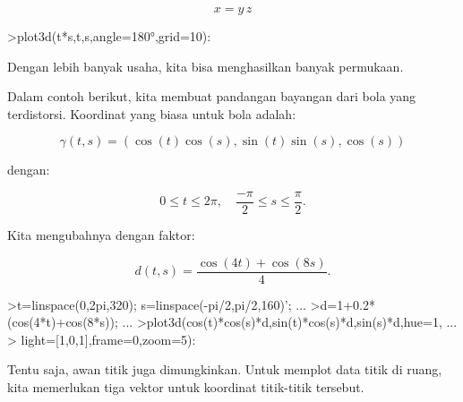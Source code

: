 \documentclass[a4paper,10pt]{article}
\begin{document}
\begin{eulernotebook}
\begin{eulercomment}
\begin{eulercomment}
\begin{eulercomment}
\end{eulercomment}
\begin{eulerformula}
\[
x = y \, z
\]
\end{eulerformula}
\begin{eulerprompt}
>plot3d(t*s,t,s,angle=180°,grid=10):
\end{eulerprompt}
\begin{eulercomment}
Dengan lebih banyak usaha, kita bisa menghasilkan banyak permukaan.

Dalam contoh berikut, kita membuat pandangan bayangan dari bola yang
terdistorsi. Koordinat yang biasa untuk bola adalah:

\end{eulercomment}
\begin{eulerformula}
\[
\gamma(t,s) = (\cos(t)\cos(s),\sin(t)\sin(s),\cos(s))
\]
\end{eulerformula}
\begin{eulercomment}
dengan:

\end{eulercomment}
\begin{eulerformula}
\[
0 \le t \le 2\pi, \quad \frac{-\pi}{2} \le s \le \frac{\pi}{2}.
\]
\end{eulerformula}
\begin{eulercomment}
Kita mengubahnya dengan faktor:

\end{eulercomment}
\begin{eulerformula}
\[
d(t,s) = \frac{\cos(4t)+\cos(8s)}{4}.
\]
\end{eulerformula}
\begin{eulerprompt}
>t=linspace(0,2pi,320); s=linspace(-pi/2,pi/2,160)'; ...
>d=1+0.2*(cos(4*t)+cos(8*s)); ...
>plot3d(cos(t)*cos(s)*d,sin(t)*cos(s)*d,sin(s)*d,hue=1, ...
>  light=[1,0,1],frame=0,zoom=5):
\end{eulerprompt}
\begin{eulercomment}
Tentu saja, awan titik juga dimungkinkan. Untuk memplot data titik di
ruang, kita memerlukan tiga vektor untuk koordinat titik-titik
tersebut.


\end{eulercomment}
\end{eulercomment}
\end{eulercomment}
\end{eulernotebook}
\end{document}
